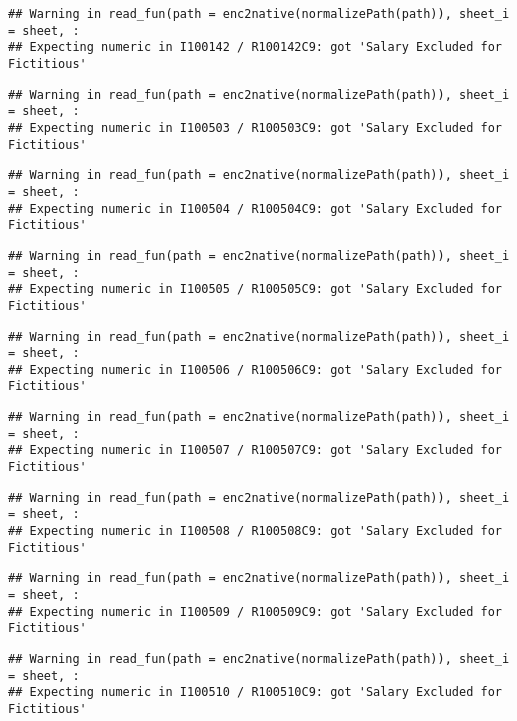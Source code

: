 \documentclass[
]{article}
\begin{document}
\begin{verbatim}
## Warning in read_fun(path = enc2native(normalizePath(path)), sheet_i = sheet, :
## Expecting numeric in I100142 / R100142C9: got 'Salary Excluded for Fictitious'
\end{verbatim}

\begin{verbatim}
## Warning in read_fun(path = enc2native(normalizePath(path)), sheet_i = sheet, :
## Expecting numeric in I100503 / R100503C9: got 'Salary Excluded for Fictitious'
\end{verbatim}

\begin{verbatim}
## Warning in read_fun(path = enc2native(normalizePath(path)), sheet_i = sheet, :
## Expecting numeric in I100504 / R100504C9: got 'Salary Excluded for Fictitious'
\end{verbatim}

\begin{verbatim}
## Warning in read_fun(path = enc2native(normalizePath(path)), sheet_i = sheet, :
## Expecting numeric in I100505 / R100505C9: got 'Salary Excluded for Fictitious'
\end{verbatim}

\begin{verbatim}
## Warning in read_fun(path = enc2native(normalizePath(path)), sheet_i = sheet, :
## Expecting numeric in I100506 / R100506C9: got 'Salary Excluded for Fictitious'
\end{verbatim}

\begin{verbatim}
## Warning in read_fun(path = enc2native(normalizePath(path)), sheet_i = sheet, :
## Expecting numeric in I100507 / R100507C9: got 'Salary Excluded for Fictitious'
\end{verbatim}

\begin{verbatim}
## Warning in read_fun(path = enc2native(normalizePath(path)), sheet_i = sheet, :
## Expecting numeric in I100508 / R100508C9: got 'Salary Excluded for Fictitious'
\end{verbatim}

\begin{verbatim}
## Warning in read_fun(path = enc2native(normalizePath(path)), sheet_i = sheet, :
## Expecting numeric in I100509 / R100509C9: got 'Salary Excluded for Fictitious'
\end{verbatim}

\begin{verbatim}
## Warning in read_fun(path = enc2native(normalizePath(path)), sheet_i = sheet, :
## Expecting numeric in I100510 / R100510C9: got 'Salary Excluded for Fictitious'
\end{verbatim}
\end{document}
